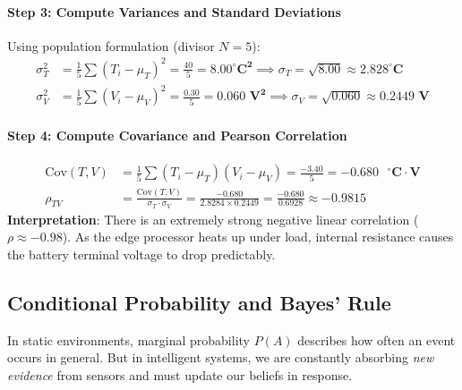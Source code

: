 \begin{example}
\paragraph{Step 3: Compute Variances and Standard Deviations}
Using population formulation (divisor $N = 5$):
\begin{align*}
\sigma_T^2 &= \frac{1}{5} \sum (T_i - \mu_T)^2 = \frac{40}{5} = \mathbf{8.00^\circ\text{C}^2} \implies \sigma_T = \sqrt{8.00} \approx \mathbf{2.828^\circ\text{C}} \\
\sigma_V^2 &= \frac{1}{5} \sum (V_i - \mu_V)^2 = \frac{0.30}{5} = \mathbf{0.060\text{ V}^2} \implies \sigma_V = \sqrt{0.060} \approx \mathbf{0.2449\text{ V}}
\end{align*}

\paragraph{Step 4: Compute Covariance and Pearson Correlation}
\begin{align*}
\text{Cov}(T, V) &= \frac{1}{5} \sum (T_i - \mu_T)(V_i - \mu_V) = \frac{-3.40}{5} = \mathbf{-0.680\text{ }^\circ\text{C}\cdot\text{V}} \\
\rho_{TV} &= \frac{\text{Cov}(T, V)}{\sigma_T \cdot \sigma_V} = \frac{-0.680}{2.8284 \times 0.2449} = \frac{-0.680}{0.6928} \approx \mathbf{-0.9815}
\end{align*}
\textbf{Interpretation}: There is an extremely strong negative linear correlation ($\rho \approx -0.98$). As the edge processor heats up under load, internal resistance causes the battery terminal voltage to drop predictably.
\end{example}

\subsection{Conditional Probability and Bayes' Rule}\label{subsec:prob_bayes}

In static environments, marginal probability $P(A)$ describes how often an event occurs in general. But in intelligent systems, we are constantly absorbing \textit{new evidence} from sensors and must update our beliefs in response.

